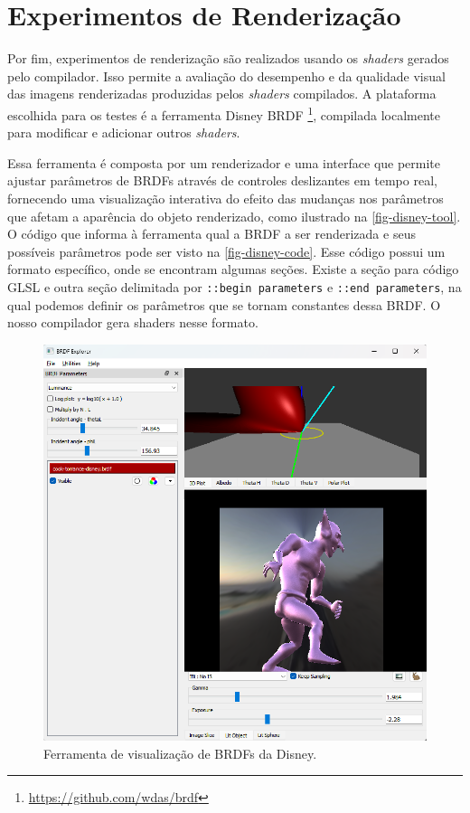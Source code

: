 \section{Experimentos de Renderização} \label{experimentos-renderizacao}


Por fim, experimentos de renderização são realizados usando os \textit{shaders} gerados pelo compilador. Isso permite a avaliação do desempenho e da qualidade visual das imagens renderizadas produzidas pelos \textit{shaders} compilados. A plataforma escolhida para os testes é a ferramenta \label{disney-brdf-tool} Disney BRDF \footnote{\url{https://github.com/wdas/brdf}}, compilada localmente para modificar e adicionar outros
\textit{shaders}.


Essa ferramenta é composta por um renderizador e uma interface que permite ajustar parâmetros de BRDFs através de controles deslizantes em tempo real, fornecendo uma visualização interativa do efeito das mudanças nos parâmetros que afetam a aparência do objeto renderizado, como ilustrado na \autoref{fig-disney-tool}. O código que informa à ferramenta qual a BRDF a ser renderizada e seus possíveis parâmetros pode ser visto na \autoref{fig-disney-code}. Esse código possui um formato específico, onde se encontram algumas seções. Existe a seção para código GLSL e outra seção delimitada por \texttt{::begin parameters} e \texttt{::end parameters}, na qual podemos definir os parâmetros que se tornam constantes dessa BRDF. O nosso compilador gera shaders nesse formato.



\begin{figure}[htb]
        \caption{\label{fig-disney-tool} \small Ferramenta de visualização de BRDFs da Disney.}
        \begin{center}
            \includegraphics[scale=0.65]{./Imagens/disney-brdf-tool-original.png}
        \end{center}
\end{figure}


